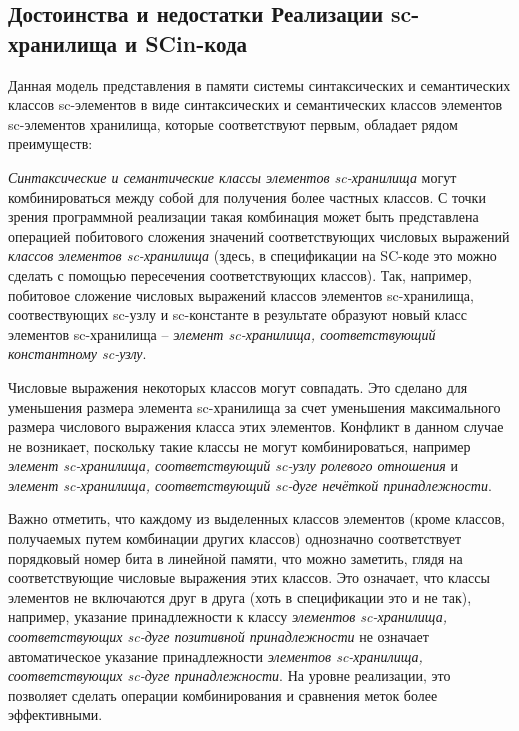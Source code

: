 \subsection{Достоинства и недостатки Реализации sc-хранилища и SCin-кода}
\label{sec_soft_platform_scin_code_problems}

Данная модель представления в памяти системы синтаксических и семантических классов sc-элементов в виде синтаксических и семантических классов элементов sc-элементов хранилища, которые соответствуют первым, обладает рядом преимуществ:
\begin{textitemize}
    \item \textit{Синтаксические и семантические классы элементов sc-хранилища} могут комбинироваться между собой для получения более частных классов. С точки зрения программной реализации такая комбинация может быть представлена операцией побитового сложения значений соответствующих числовых выражений \textit{классов элементов sc-хранилища} (здесь, в спецификации на SC-коде это можно сделать с помощью пересечения соответствующих классов). Так, например, побитовое сложение числовых выражений классов элементов sc-хранилища, соотвествующих sc-узлу и sc-константе в результате образуют новый класс элементов sc-хранилища -- \textit{элемент sc-хранилища, соответствующий константному sc-узлу}.
    \item Числовые выражения некоторых классов могут совпадать. Это сделано для уменьшения размера элемента sc-хранилища за счет уменьшения максимального размера числового выражения класса этих элементов. Конфликт в данном случае не возникает, поскольку такие классы не могут комбинироваться, например \textit{элемент sc-хранилища, соответствующий sc-узлу ролевого отношения} и \textit{элемент sc-хранилища, соответствующий sc-дуге нечёткой принадлежности}.
    \item Важно отметить, что каждому из выделенных классов элементов (кроме классов, получаемых путем комбинации других классов) однозначно соответствует порядковый номер бита в линейной памяти, что можно заметить, глядя на соответствующие числовые выражения этих классов. Это означает, что классы элементов не включаются друг в друга (хоть в спецификации это и не так), например, указание принадлежности к классу \textit{элементов sc-хранилища, соответствующих sc-дуге позитивной принадлежности} не означает автоматическое указание принадлежности \textit{элементов sc-хранилища, соответствующих sc-дуге принадлежности}. На уровне реализации, это позволяет сделать операции комбинирования и сравнения меток более эффективными.
\end{textitemize}

